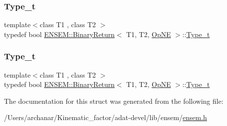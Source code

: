\mbox{\label{structENSEM_1_1BinaryReturn_3_01T1_00_01T2_00_01OpNE_01_4_a9da65a077e200526d6270d806c19dcd6}} 
\subsubsection{\texorpdfstring{Type\_t}{Type\_t}\hspace{0.1cm}{\footnotesize\ttfamily [2/3]}}
{\footnotesize\ttfamily template$<$class T1 , class T2 $>$ \\
typedef bool \mbox{\hyperlink{structENSEM_1_1BinaryReturn}{E\+N\+S\+E\+M\+::\+Binary\+Return}}$<$ T1, T2, \mbox{\hyperlink{structENSEM_1_1OpNE}{Op\+NE}} $>$\+::\mbox{\hyperlink{structENSEM_1_1BinaryReturn_3_01T1_00_01T2_00_01OpNE_01_4_a9da65a077e200526d6270d806c19dcd6}{Type\+\_\+t}}}

\mbox{\label{structENSEM_1_1BinaryReturn_3_01T1_00_01T2_00_01OpNE_01_4_a9da65a077e200526d6270d806c19dcd6}} 
\subsubsection{\texorpdfstring{Type\_t}{Type\_t}\hspace{0.1cm}{\footnotesize\ttfamily [3/3]}}
{\footnotesize\ttfamily template$<$class T1 , class T2 $>$ \\
typedef bool \mbox{\hyperlink{structENSEM_1_1BinaryReturn}{E\+N\+S\+E\+M\+::\+Binary\+Return}}$<$ T1, T2, \mbox{\hyperlink{structENSEM_1_1OpNE}{Op\+NE}} $>$\+::\mbox{\hyperlink{structENSEM_1_1BinaryReturn_3_01T1_00_01T2_00_01OpNE_01_4_a9da65a077e200526d6270d806c19dcd6}{Type\+\_\+t}}}



The documentation for this struct was generated from the following file\+:\begin{DoxyCompactItemize}
\item 
/\+Users/archanar/\+Kinematic\+\_\+factor/adat-\/devel/lib/ensem/\mbox{\hyperlink{adat-devel_2lib_2ensem_2ensem_8h}{ensem.\+h}}\end{DoxyCompactItemize}
